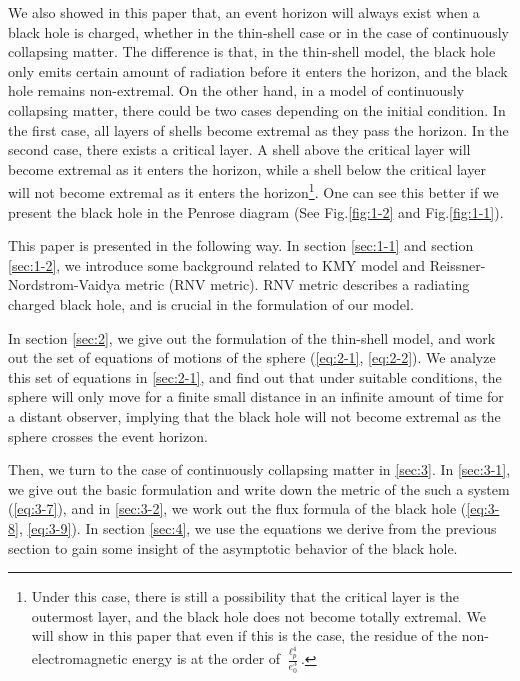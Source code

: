 \documentclass[letterpaper,12pt]{article}
\begin{document}
We also showed in this paper that, an event horizon will always exist when a black hole is charged, whether in the thin-shell case or in the case of continuously collapsing matter. The difference is that, in the thin-shell model, the black hole only emits certain amount of radiation before it enters the horizon, and the black hole remains non-extremal. On the other hand, in a model of continuously collapsing matter, there could be two cases depending on the initial condition. In the first case, all layers of shells become extremal as they pass the horizon. In the second case, there exists a critical layer. A shell above the critical layer will become extremal as it enters the horizon, while a shell below the critical layer will not become extremal as it enters the horizon\footnote{Under this case, there is still a possibility that the critical layer is the outermost layer, and the black hole does not become totally extremal. We will show in this paper that even if this is the case, the residue of the non-electromagnetic energy is at the order of $\frac{\ell_{p}^{4}}{e_{0}^{3}}$.}. One can see this better if we present the black hole in the Penrose diagram (See Fig.\ref{fig:1-2} and Fig.\ref{fig:1-1}).

This paper is presented in the following way. In section \ref{sec:1-1} and section \ref{sec:1-2}, we introduce some background related to KMY model and Reissner-Nordstrom-Vaidya metric (RNV metric). RNV metric describes a radiating charged black hole, and is crucial in the formulation of our model. 

In section \ref{sec:2}, we give out the formulation of the thin-shell model, and work out the set of equations of motions of the sphere (\ref{eq:2-1}, \ref{eq:2-2}). We analyze this set of equations in \ref{sec:2-1}, and find out that under suitable conditions, the sphere will only move for a finite small distance in an infinite amount of time for a distant observer, implying that the black hole will not become extremal as the sphere crosses the event horizon. 

Then, we turn to the case of continuously collapsing matter in \ref{sec:3}. In \ref{sec:3-1}, we give out the basic formulation and write down the metric of the such a system (\ref{eq:3-7}), and in \ref{sec:3-2}, we work out the flux formula of the black hole (\ref{eq:3-8}, \ref{eq:3-9}). In section \ref{sec:4}, we use the equations we derive from the previous section to gain some insight of the asymptotic behavior of the black hole. 
\end{document}
